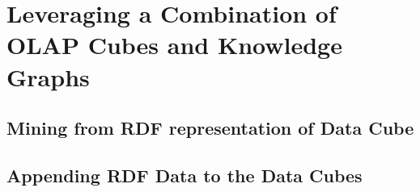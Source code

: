 \chapter{Leveraging a Combination of OLAP Cubes and Knowledge Graphs}




\section{Mining from RDF representation of Data Cube}







\section{Appending RDF Data to the Data Cubes}


